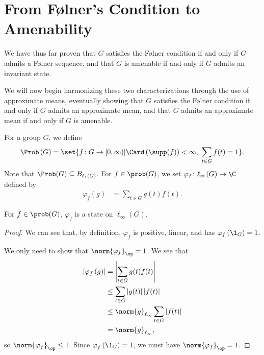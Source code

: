 \section{From Følner's Condition to Amenability}\label{sec:approximate_means}%
We have thus far proven that $G$ satisfies the Følner condition if and only if $G$ admits a Følner sequence, and that $G$ is amenable if and only if $G$ admits an invariant state.\newline

We will now begin harmonizing these two characterizations through the use of approximate means, eventually showing that $G$ satisfies the Følner condition if and only if $G$ admits an approximate mean, and that $G$ admits an approximate mean if and only if $G$ is amenable.
\begin{definition}\label{def:state_on_prob_g}
  For a group $G$, we define
  \begin{align*}
    \Prob\left(G\right) = \set{f\colon G\rightarrow [0,\infty) | \Card\left(\supp(f)\right)  < \infty,~\sum_{t\in G}f(t) = 1}.
  \end{align*}
  Note that $\Prob(G) \subseteq B_{\ell_1\left(G\right)}$. For $f\in \prob(G)$, we set $\varphi_f\colon \ell_{\infty}(G)\rightarrow \C$ defined by
  \begin{align*}
    \varphi_f\left(g\right) &= \sum_{t\in G}g(t)f(t).
  \end{align*}
\end{definition}
\begin{fact}\label{fact:prob_g_state}
  For $f\in \prob(G)$, $\varphi_f$ is a state on $\ell_{\infty}\left(G\right)$.
\end{fact}
\begin{proof}
We can see that, by definition, $\varphi_f$ is positive, linear, and has $\varphi_f\left(\1_{G}\right) = 1$.\newline

We only need to show that $\norm{\varphi_f}_{\op} = 1$. We see that
\begin{align*}
  \left\vert \varphi_f\left(g\right) \right\vert &= \left\vert \sum_{t\in G}g(t)f(t) \right\vert\\
                                                 &\leq \sum_{t\in G}\left\vert g(t) \right\vert\left\vert f(t) \right\vert\\
                                                 &\leq \norm{g}_{\ell_\infty}\sum_{t\in G}\left\vert f(t) \right\vert\\
                                                 &= \norm{g}_{\ell_\infty},
\end{align*}
so $\norm{\varphi_f}_{\op} \leq 1$. Since $\varphi_f\left(\1_G\right) = 1$, we must have $\norm{\varphi_f}_{\op} = 1$.
\end{proof}
